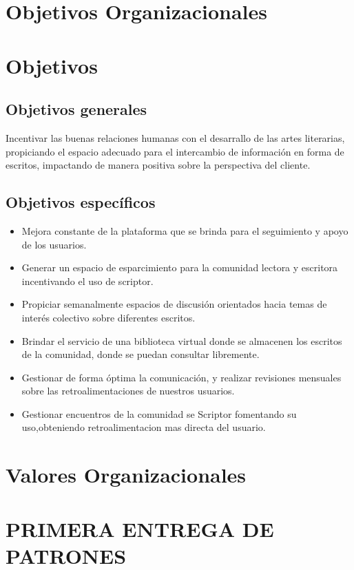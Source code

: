 \section{Objetivos Organizacionales}

\section{Objetivos}

\subsection{Objetivos generales}
Incentivar las buenas relaciones humanas con el desarrallo de las artes literarias, propiciando el espacio adecuado para el intercambio de información en forma de escritos, impactando de manera positiva sobre la perspectiva del cliente.


\subsection{Objetivos específicos}
\begin{itemize}
	\item Mejora constante de la plataforma que se brinda para el seguimiento y apoyo de los usuarios.
	
	\item Generar un espacio de esparcimiento para la comunidad lectora y escritora incentivando el uso de scriptor.
	
	\item Propiciar semanalmente espacios de discusión orientados hacia temas de interés colectivo sobre diferentes escritos. 
	
	\item Brindar el servicio de una biblioteca virtual donde se almacenen los escritos de la comunidad, donde se puedan consultar libremente.
	
	\item Gestionar de forma óptima la comunicación, y realizar revisiones mensuales sobre las retroalimentaciones de nuestros usuarios.
	
	\item Gestionar encuentros de la comunidad se Scriptor fomentando su uso,obteniendo retroalimentacion mas directa del usuario.
	
\end{itemize}
\section{Valores Organizacionales}
\section{PRIMERA ENTREGA DE PATRONES}


